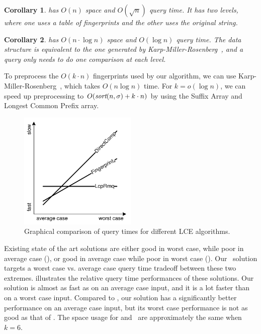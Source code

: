 \documentclass[a4]{article}
\newcommand*{\pref}{\prettyref}
\newtheorem{corollary}{Corollary}
\begin{document}
\begin{corollary}
\fprint[2] has $O(n)$ space and $O(\sqrt n)$ query time. It has two levels, where one uses a table of fingerprints and the other uses the original string.
\end{corollary}

\begin{corollary}
\fprint[\logceil] has $O(n\cdot\log n)$ space and $O(\log n)$ query time. The data structure is equivalent to the one generated by Karp-Miller-Rosenberg~\cite{karp-miller-rosenberg}, and a query only needs to do one comparison at each level.
\end{corollary}

To preprocess the $O(k\cdot n)$ fingerprints used by our algorithm, we can use Karp-Miller-Rosenberg~\cite{karp-miller-rosenberg}, which takes $O(n\log n)$ time. For $k=o(\log n)$, we can speed up preprocessing to $O(\textit{sort}(n,\sigma) + k\cdot n)$ by using the Suffix Array and Longest Common Prefix array.

\begin{figure}[tp]
    \begin{center}
        \includegraphics[width=0.5\textwidth,page=1]{wc-avg.pdf}
    \end{center}
    \caption{\label{fig:wc-avg}Graphical comparison of query times for different LCE algorithms.}
\end{figure}

Existing state of the art solutions are either good in worst case, while poor in average case (), or good in average case while poor in worst case (). Our \fprintk\ solution targets a worst case vs. average case query time tradeoff between these two extremes. \pref{fig:wc-avg} illustrates the relative query time performances of these solutions. Our solution is almost as fast as  on an average case input, and it is a lot faster than  on a worst case input. Compared to , our solution has a significantly better performance on an average case input, but its worst case performance is not as good as that of . The space usage for  and \fprintk\ are approximately the same when $k=6$.
\end{document}
